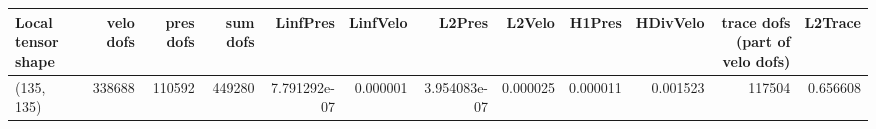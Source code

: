 \begin{tabular}{lrrrrrrrrrrr}
\toprule
Local tensor shape &  velo dofs &  pres dofs &  sum dofs &     LinfPres &  LinfVelo &       L2Pres &   L2Velo &   H1Pres &  HDivVelo &  trace dofs (part of velo dofs) &  L2Trace \\
\midrule
        (135, 135) &     338688 &     110592 &    449280 & 7.791292e-07 &  0.000001 & 3.954083e-07 & 0.000025 & 0.000011 &  0.001523 &                          117504 & 0.656608 \\
\bottomrule
\end{tabular}
